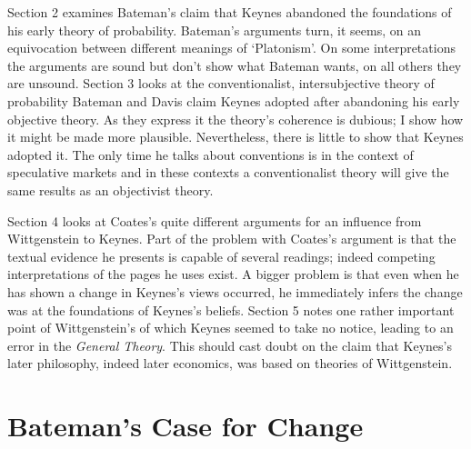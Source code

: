 \documentclass[
  11pt,
  letterpaper,
  DIV=11,
  numbers=noendperiod,
  twoside]{scrartcl}
\begin{document}
Section 2 examines Bateman's claim that Keynes abandoned the foundations
of his early theory of probability. Bateman's arguments turn, it seems,
on an equivocation between different meanings of `Platonism'. On some
interpretations the arguments are sound but don't show what Bateman
wants, on all others they are unsound. Section 3 looks at the
conventionalist, intersubjective theory of probability Bateman and Davis
claim Keynes adopted after abandoning his early objective theory. As
they express it the theory's coherence is dubious; I show how it might
be made more plausible. Nevertheless, there is little to show that
Keynes adopted it. The only time he talks about conventions is in the
context of speculative markets and in these contexts a conventionalist
theory will give the same results as an objectivist theory.

Section 4 looks at Coates's quite different arguments for an influence
from Wittgenstein to Keynes. Part of the problem with Coates's argument
is that the textual evidence he presents is capable of several readings;
indeed competing interpretations of the pages he uses exist. A bigger
problem is that even when he has shown a change in Keynes's views
occurred, he immediately infers the change was at the foundations of
Keynes's beliefs. Section 5 notes one rather important point of
Wittgenstein's of which Keynes seemed to take no notice, leading to an
error in the \emph{General Theory}. This should cast doubt on the claim
that Keynes's later philosophy, indeed later economics, was based on
theories of Wittgenstein.

\section{Bateman's Case for Change}\label{batemans-case-for-change}
\end{document}
